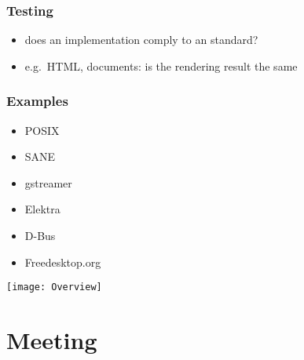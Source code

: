 \begin{frame}
	\frametitle{Testing}

	\begin{itemize}[<+-| alert@+>]
	\item does an implementation comply to an standard?
	\item e.g.\ HTML, documents: is the rendering result the same
	\end{itemize}
\end{frame}

\begin{frame}
	\frametitle{Examples}

	\begin{itemize}[<+-| alert@+>]
	\item POSIX
	\item SANE
	\item gstreamer
	\item Elektra
	\item D-Bus
	\item Freedesktop.org
	\end{itemize}
\end{frame}

\begin{frame}
	\texttt{[image: Overview]}
\end{frame}

\section{Meeting}

